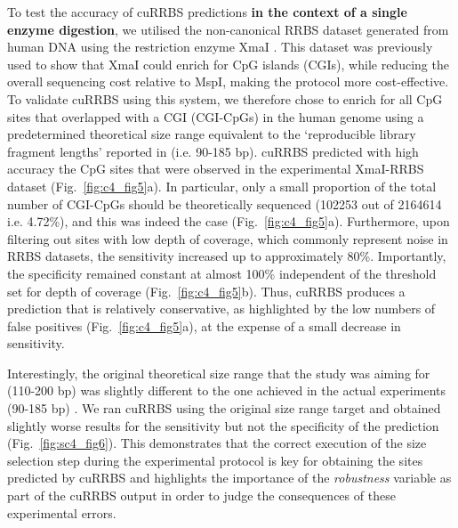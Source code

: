To test the accuracy of cuRRBS predictions \textbf{in the context of a single enzyme digestion}, we utilised the non-canonical RRBS dataset generated from human DNA using the restriction enzyme XmaI \cite{Tanas2017}. This dataset was previously used to show that XmaI could enrich for CpG islands (\acrshort{CGI}s), while reducing the overall sequencing cost relative to MspI, making the protocol more cost-effective. To validate cuRRBS using this system, we therefore chose to enrich for all CpG sites that overlapped with a CGI (CGI-CpGs) in the human genome using a predetermined theoretical size range equivalent to the `reproducible library fragment lengths' reported in \cite{Tanas2017} (i.e. 90-185 bp). cuRRBS predicted with high accuracy the CpG sites that were observed in the experimental XmaI-RRBS dataset (Fig.~\ref{fig:c4_fig5}a). In particular, only a small proportion of the total number of CGI-CpGs should be theoretically sequenced (102253 out of 2164614 i.e. 4.72\%), and this was indeed the case (Fig.~\ref{fig:c4_fig5}a). Furthermore, upon filtering out sites with low depth of coverage, which commonly represent noise in RRBS datasets, the sensitivity increased up to approximately 80\%. Importantly, the specificity remained constant at almost 100\% independent of the threshold set for depth of coverage (Fig.~\ref{fig:c4_fig5}b). Thus, cuRRBS produces a prediction that is relatively conservative, as highlighted by the low numbers of false positives (Fig.~\ref{fig:c4_fig5}a), at the expense of a small decrease in sensitivity.

\bigskip

Interestingly, the original theoretical size range that the study was aiming for (110-200 bp) was slightly different to the one achieved in the actual experiments (90-185 bp) \cite{Tanas2017}. We ran cuRRBS using the original size range target and obtained slightly worse results for the sensitivity but not the specificity of the prediction (Fig.~\ref{fig:sc4_fig6}). This demonstrates that the correct execution of the size selection step during the experimental protocol is key for obtaining the sites predicted by cuRRBS and highlights the importance of the \textit{robustness} variable as part of the cuRRBS output in order to judge the consequences of these experimental errors.

